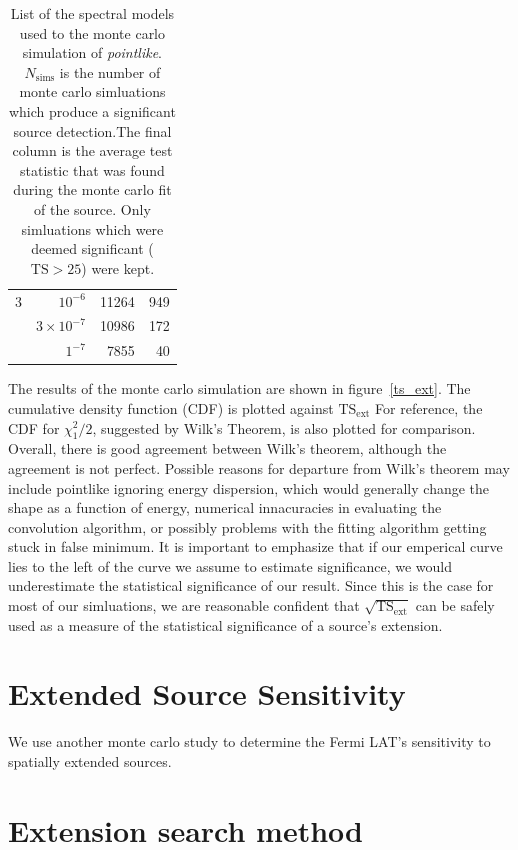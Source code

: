 \documentclass{emulateapj}
\begin{document}
\begin{table}
\begin{centering}
\begin{tabular}{ | r | r | r | r | }
\hline                                                
    3 &          $10^{-6}$ &           11264 &    949 \\
      &  $3\times 10^{-7}$ &           10986 &    172 \\
      &           $1^{-7}$ &            7855 &     40 \\
\hline
\end{tabular}
\caption{List of the spectral models used to the monte carlo simulation of
{\em pointlike}.$N_\text{sims}$ is the number of monte carlo simluations
which produce a significant source detection.The final column is the
average test statistic that was found during the monte carlo fit of
the source. Only simluations which were deemed significant ($\text{TS}>25$)
were kept.}
\label{ts_ext_num_sims}
  \end{centering}
\end{table}

The results of the monte carlo simulation are shown in
figure~\ref{ts_ext}.  The cumulative density function (CDF) is plotted
against $\text{TS}_\text{ext}$ For reference, the CDF for $\chi^2_1/2$,
suggested by Wilk's Theorem, is also plotted for comparison. Overall,
there is good agreement between Wilk's theorem, although the agreement
is not perfect.  Possible reasons for departure from Wilk's theorem may
include pointlike ignoring energy dispersion, which would generally change
the shape as a function of energy, numerical innacuracies in evaluating
the convolution algorithm, or possibly problems with the fitting algorithm
getting stuck in false minimum. It is important to emphasize that if
our emperical curve lies to the left of the curve we assume to estimate
significance, we would underestimate the statistical significance of
our result. Since this is the case for most of our simluations, we are
reasonable confident that $\sqrt{\text{TS}_\text{ext}}$ can be safely
used as a measure of the statistical significance of a source's extension.

\section{Extended Source Sensitivity}

We use another monte carlo study to determine the Fermi LAT's sensitivity to
spatially extended sources.


\section{Extension search method}
\end{document}
